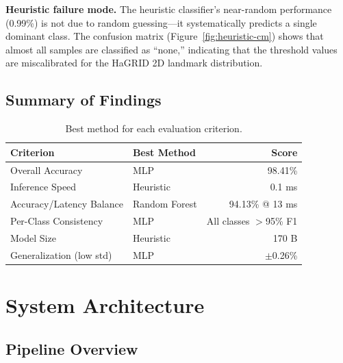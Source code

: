 \documentclass[11pt,a4paper]{article}
\begin{document}
\textbf{Heuristic failure mode.} The heuristic classifier's near-random performance (0.99\%) is not due to random guessing---it systematically predicts a single dominant class. The confusion matrix (Figure~\ref{fig:heuristic-cm}) shows that almost all samples are classified as ``none,'' indicating that the threshold values are miscalibrated for the HaGRID 2D landmark distribution.

\subsection{Summary of Findings}

\begin{table}[H]
\centering
\caption{Best method for each evaluation criterion.}
\label{tab:summary}
\begin{tabular}{@{}llr@{}}
\toprule
\textbf{Criterion} & \textbf{Best Method} & \textbf{Score} \\
\midrule
Overall Accuracy & MLP & 98.41\% \\
Inference Speed & Heuristic & 0.1 ms \\
Accuracy/Latency Balance & Random Forest & 94.13\% @ 13 ms \\
Per-Class Consistency & MLP & All classes $>$95\% F1 \\
Model Size & Heuristic & 170 B \\
Generalization (low std) & MLP & $\pm$0.26\% \\
\bottomrule
\end{tabular}
\end{table}

\section{System Architecture}
\label{sec:architecture}

\subsection{Pipeline Overview}
\end{document}
